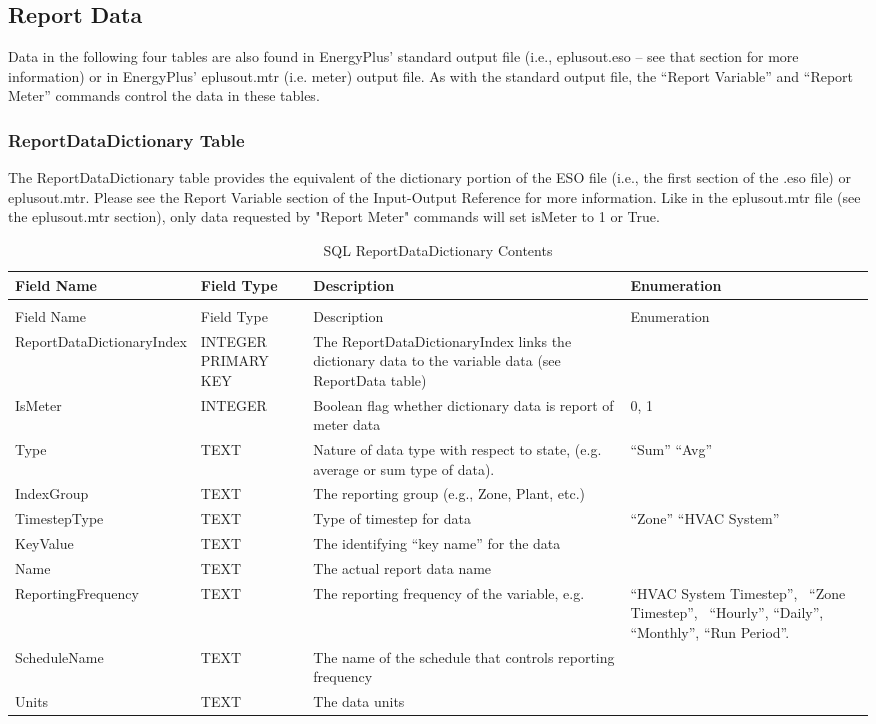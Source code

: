 \subsection{Report Data}

Data in the following four tables are also found in EnergyPlus’ standard output file (i.e., eplusout.eso – see that section for more information) or in EnergyPlus' eplusout.mtr (i.e. meter) output file. As with the standard output file, the “Report Variable” and “Report Meter” commands control the data in these tables.

\subsubsection{ReportDataDictionary Table}

The ReportDataDictionary table provides the equivalent of the dictionary portion of the ESO file (i.e., the first section of the .eso file) or eplusout.mtr. Please see the Report Variable section of the Input-Output Reference for more information.  Like in the eplusout.mtr file (see the eplusout.mtr section), only data requested by "Report Meter" commands will set isMeter to 1 or True.

\begin{longtable}[c]{p{1.5in}p{1.5in}p{1.5in}p{1.5in}}
\caption{SQL ReportDataDictionary Contents \label{table:table-7.-sql-reportdatadictionary-contents}} \tabularnewline
\toprule 
Field Name & Field Type & Description & Enumeration \tabularnewline
\midrule
\endfirsthead

\caption[]{SQL ReportDataDictionary Contents} \tabularnewline
\toprule 
Field Name & Field Type & Description & Enumeration \tabularnewline
\midrule
\endhead

ReportDataDictionaryIndex & INTEGER PRIMARY KEY & The ReportDataDictionaryIndex links the dictionary data to the variable data (see ReportData table) & ~ \tabularnewline
IsMeter & INTEGER & Boolean flag whether dictionary data is report of meter data & 0, 1 \tabularnewline
Type & TEXT & Nature of data type with respect to state, (e.g. average or sum type of data). & “Sum” “Avg” \tabularnewline
IndexGroup & TEXT & The reporting group (e.g., Zone, Plant, etc.) & ~ \tabularnewline
TimestepType & TEXT & Type of timestep for data & “Zone”
    “HVAC System” \tabularnewline
KeyValue & TEXT & The identifying “key name” for the data & ~ \tabularnewline
Name & TEXT & The actual report data name & ~ \tabularnewline
ReportingFrequency & TEXT & The reporting frequency of the variable, e.g. & “HVAC System Timestep”,~ “Zone Timestep”,~ “Hourly”, “Daily”, “Monthly”, “Run Period”. \tabularnewline
ScheduleName & TEXT & The name of the schedule that controls reporting frequency & ~ \tabularnewline
Units & TEXT & The data units & ~ \tabularnewline
\bottomrule
\end{longtable}

